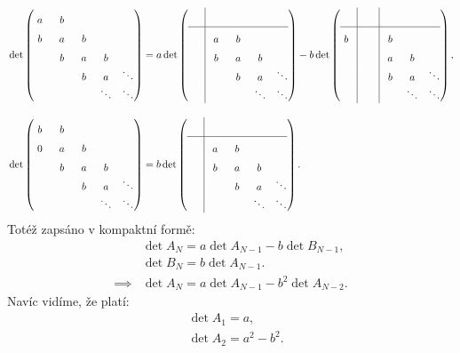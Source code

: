 \documentclass[10pt,a4paper]{article}
\makeatletter
\def\ph{\phantom}
\def\vph{\vphantom}
\newcommand{\mat}[1]{
    \begin{pmatrix}
        #1
    \end{pmatrix}
}
\newcommand{\mata}[2]{
    \left(
    \begin{array}{@{}#1@{}}
        #2
    \end{array}
    \right)
}
\makeatother
\begin{document}
\begin{align*}
    &\det
    \mat{
        a & b & \vph{\ddots} \\
        b & a & b & \vph{\ddots} \\
          & b & a & b & \vph{\ddots} \\
          &   & b & a   & \ddots \\
        \ph{\ddots} & \ph{\ddots} & \ph{\ddots} & \ddots & \ddots
    }
    =
    a \det
    \mata{c|cccc}{
          &   & \vph{\ddots} \\\hline
          & a & b & \vph{\ddots} \\
          & b & a & b & \vph{\ddots} \\
          &   & b & a   & \ddots \\
        \ph{\ddots} & \ph{\ddots} & \ph{\ddots} & \ddots & \ddots
    }
    -
    b \det
    \mata{c|c|ccc}{
          &   & \vph{\ddots} \\\hline
        b &   & b & \vph{\ddots} \\
          &   & a & b & \vph{\ddots} \\
          &   & b & a   & \ddots \\
        \ph{\ddots} & \ph{\ddots} & \ph{\ddots} & \ddots & \ddots
    },
    \\[10pt]
    &\det
    \mat{
        b & b & \vph{\ddots} \\
        0 & a & b & \vph{\ddots} \\
          & b & a & b & \vph{\ddots} \\
          &   & b & a   & \ddots \\
        \ph{\ddots} & \ph{\ddots} & \ph{\ddots} & \ddots & \ddots
    }
    =
    b \det
    \mata{c|cccc}{
          &   & \vph{\ddots} \\\hline
          & a & b & \vph{\ddots} \\
          & b & a & b & \vph{\ddots} \\
          &   & b & a   & \ddots \\
        \ph{\ddots} & \ph{\ddots} & \ph{\ddots} & \ddots & \ddots
    }.
    \\
\end{align*}
Totéž zapsáno v kompaktní formě:
\begin{align*}
    &\det A_N = a \det A_{N-1} - b \det B_{N-1}, \\
    &\det B_N = b \det A_{N-1}.
    \\[5pt]
    \implies &\det A_N = a \det A_{N-1} - b^2 \det A_{N-2}.
\end{align*}
Navíc vidíme, že platí:
\begin{align*}
    &\det A_1 = a, \\
    &\det A_2 = a^2 - b^2.
\end{align*}
\end{document}

